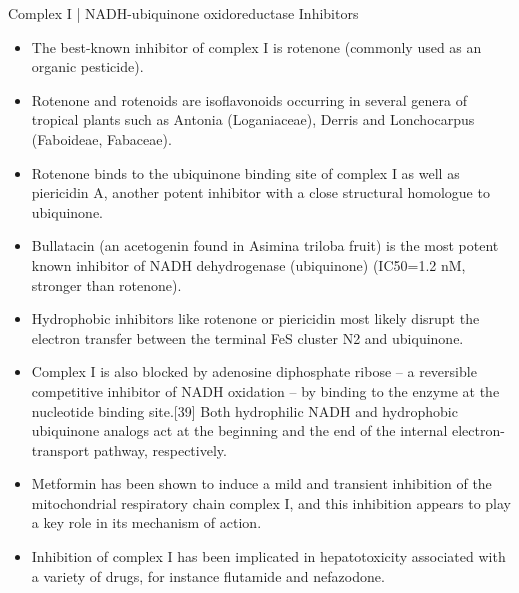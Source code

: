 \documentclass[presentation, smaller]{beamer}
\begin{document}
\begin{frame}[label={sec:org33a5051}]{Complex I | NADH-ubiquinone oxidoreductase Inhibitors}
\begin{itemize}
\item The best-known inhibitor of complex I is rotenone (commonly used as an organic pesticide).
\item Rotenone and rotenoids are isoflavonoids occurring in several genera of tropical plants such as Antonia (Loganiaceae), Derris and Lonchocarpus (Faboideae, Fabaceae).
\item Rotenone binds to the ubiquinone binding site of complex I as well as piericidin A, another potent inhibitor with a close structural homologue to ubiquinone.
\item Bullatacin (an acetogenin found in Asimina triloba fruit) is the most potent known inhibitor of NADH dehydrogenase (ubiquinone) (IC50=1.2 nM, stronger than rotenone).

\item Hydrophobic inhibitors like rotenone or piericidin most likely disrupt the electron transfer between the terminal FeS cluster N2 and ubiquinone.

\item Complex I is also blocked by adenosine diphosphate ribose – a reversible competitive inhibitor of NADH oxidation – by binding to the enzyme at the nucleotide binding site.[39] Both hydrophilic NADH and hydrophobic ubiquinone analogs act at the beginning and the end of the internal electron-transport pathway, respectively.

\item Metformin has been shown to induce a mild and transient inhibition of the mitochondrial respiratory chain complex I, and this inhibition appears to play a key role in its mechanism of action.

\item Inhibition of complex I has been implicated in hepatotoxicity associated with a variety of drugs, for instance flutamide and nefazodone.
\end{itemize}
\end{frame}
\end{document}
